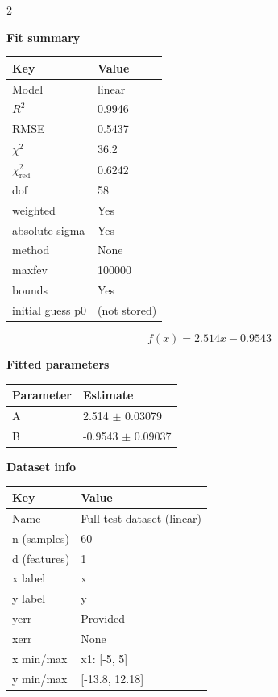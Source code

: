 \documentclass[10pt]{article}
\begin{document}
\begin{multicols}{2}

\textbf{Fit summary}\\[-2pt]
\begin{tabularx}{\linewidth}{@{}lX@{}}
\toprule
Key & Value \\
\midrule
Model & linear \\
$R^2$ & 0.9946 \\
RMSE & 0.5437 \\
$\chi^2$ & 36.2 \\
$\chi^2_{\mathrm{red}}$ & 0.6242 \\
dof & 58 \\
weighted & Yes \\
absolute sigma & Yes \\
method & None \\
maxfev & 100000 \\
bounds & Yes \\
initial guess p0 & (not stored) \\
\bottomrule
\end{tabularx}

\vspace{15pt}

\[
f(x) = 2.514 x - 0.9543
\]

\columnbreak

\textbf{Fitted parameters}\\[-2pt]
\begin{tabularx}{\linewidth}{@{}lX@{}}
\toprule
Parameter & Estimate \\
\midrule
A & 2.514 $\pm$ 0.03079 \\
B & -0.9543 $\pm$ 0.09037 \\
\bottomrule
\end{tabularx}

\vspace{8pt}

\textbf{Dataset info}\\[-0pt]
\vspace{2pt}
\begin{tabularx}{\linewidth}{@{}lX@{}}
\toprule
Key & Value \\
\midrule
Name & Full test dataset (linear) \\
n (samples) & 60 \\
d (features) & 1 \\
x label & x \\
y label & y \\
yerr & Provided \\
xerr & None \\
x min/max & x1: [-5, 5] \\
y min/max & [-13.8, 12.18] \\
\bottomrule
\end{tabularx}

\end{multicols}
\end{document}
